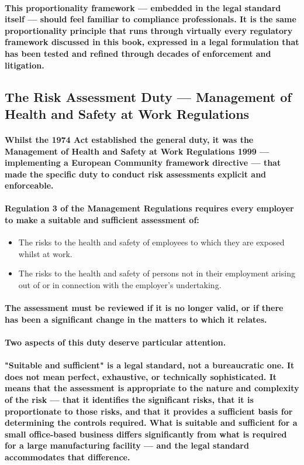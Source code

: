 \paragraph{This proportionality framework — embedded in the legal standard itself — should feel familiar to compliance professionals. It is the same proportionality principle that runs through virtually every regulatory framework discussed in this book, expressed in a legal formulation that has been tested and refined through decades of enforcement and litigation.}

\subsection{The Risk Assessment Duty — Management of Health and Safety at Work Regulations}
\paragraph{Whilst the 1974 Act established the general duty, it was the \textbf{Management of Health and Safety at Work Regulations 1999} — implementing a European Community framework directive — that made the specific duty to conduct risk assessments explicit and enforceable.}
\paragraph{Regulation 3 of the Management Regulations requires every employer to make a \textbf{suitable and sufficient} assessment of:}
\begin{itemize}
    \item{The risks to the health and safety of employees to which they are exposed whilst at work.}
    \item{The risks to the health and safety of persons not in their employment arising out of or in connection with the employer's undertaking.}
\end{itemize}
\paragraph{The assessment must be reviewed if it is no longer valid, or if there has been a significant change in the matters to which it relates.}
\paragraph{Two aspects of this duty deserve particular attention.}
\paragraph{"\textbf{Suitable and sufficient}" is a legal standard, not a bureaucratic one. It does not mean perfect, exhaustive, or technically sophisticated. It means that the assessment is appropriate to the nature and complexity of the risk — that it identifies the significant risks, that it is proportionate to those risks, and that it provides a sufficient basis for determining the controls required. What is suitable and sufficient for a small office-based business differs significantly from what is required for a large manufacturing facility — and the legal standard accommodates that difference.}
